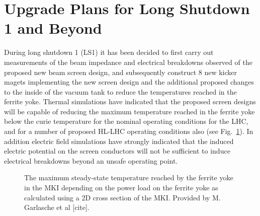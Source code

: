 \section{Upgrade Plans for Long Shutdown 1 and Beyond}

During long shutdown 1 (LS1) it has been decided to first carry out measurements of the beam impedance and electrical breakdowns observed of the proposed new beam screen design, and subsequently construct 8 new kicker magets implementing the new screen design and the additional proposed changes to the inside of the vacuum tank to reduce the temperatures reached in the ferrite yoke. Thermal simulations have indicated that the proposed screen designs will be capable of reducing the maximum temperature reached in the ferrite yoke below the curie temperature for the nominal operating conditions for the LHC, and for a number of proposed HL-LHC operating conditions also (see Fig.~\ref{fig:pow-loss-stable-temp-mkis}). In addition electric field simulations have strongly indicated that the induced electric potential on the screen conductors will not be sufficient to induce electrical breakdowns beyond an unsafe operating point. 


\begin{figure}
\label{fig:pow-loss-stable-temp-mkis}
\caption{The maximum steady-state temperature reached by the ferrite yoke in the MKI depending on the power load on the ferrite yoke as calculated using a 2D cross section of the MKI. Provided by M. Garlasche et al [cite].}
\end{figure} 